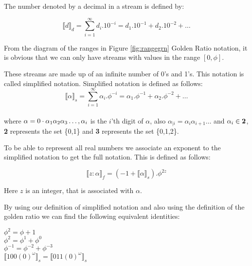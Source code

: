 \documentclass{cs4rep}
\begin{document}
The number denoted by a decimal in a stream is defined by:

\[ \llbracket d \rrbracket_{d} = \sum_{i=1}^{\infty} d_{i}.10^{-i} = d_{1}.10^{-1} + d_{2}.10^{-2} + \ldots \]

From the diagram of the ranges in Figure \ref{fig:rangegrn} Golden Ratio notation, it is obvious that we can only have streams with values in the range $[0,\phi]$. 


These streams are made up of an infinite number of 0's and
1's. This notation is called simplified notation. Simplified notation
is defined as follows:
\[ \llbracket \alpha \rrbracket_{s} = \sum_{i=1}^{\infty} \alpha_{i} . \phi^{-i} = \alpha_{1} . \phi^{-1} + \alpha_{2} . \phi^{-2} + \ldots \] \\
where $ \alpha = 0 \/ \cdot \/ \alpha_{1} \alpha_{2} \alpha_{3}
\ldots, \alpha_{i} $ is the $i$'th digit of $ \alpha $, also $
\alpha_{|i} = \alpha_{i} \alpha_{i+1} \dots $ and $ \alpha_{i} \in
{\bf 2}$, {\bf 2} represents the set \{0,1\} and {\bf 3}
  represents the set \{0,1,2\}.

To be able to represent all real numbers we associate an exponent to the simplified notation to get the full notation. This is defined as follows:

\[ \llbracket z: \alpha \rrbracket_{f} = (-1+ \llbracket \alpha \rrbracket_{s} ).\phi^{2z} \]

Here $z$ is an integer, that is associated with $\alpha$.

By using our definition of simplified notation and also using the
definition of the golden ratio we can find the following equivalent identities:

\begin{center}
\( \phi^{2} = \phi + 1                          \) \\
\( \phi^{2} = \phi^{1} + \phi^{0}                       \) \\
\( \phi^{-1} = \phi^{-2} + \phi^{-3}                     \) \\
\( \llbracket 100(0)^{\omega} \rrbracket_{s} = \llbracket 011(0)^{\omega} \rrbracket_{s} \)
\end{center}
\end{document}
